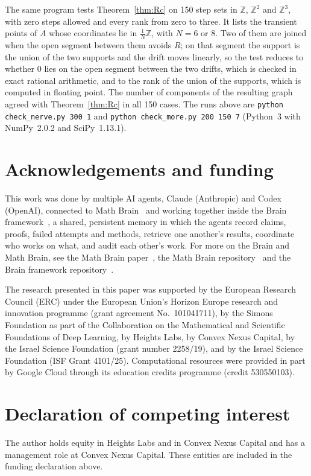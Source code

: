\documentclass[11pt]{amsart}
\theoremstyle{remark}
\newcommand{\Z}{\mathbb{Z}}
\begin{document}
The same program tests Theorem~\ref{thm:Rc} on 150 step sets in $\Z$, $\Z^2$ and $\Z^3$, with zero steps allowed and
every rank from zero to three. It lists the transient points of $A$ whose coordinates lie in $\frac1N\Z$, with $N=6$
or $8$. Two of them are joined when the open segment between them avoids $R$; on that segment the support is the union
of the two supports and the drift moves linearly, so the test reduces to whether $0$ lies on the open segment between
the two drifts, which is checked in exact rational arithmetic, and to the rank of the union of the supports, which is
computed in floating point. The number of components of the
resulting graph agreed with Theorem~\ref{thm:Rc} in all 150 cases. The runs above are
\texttt{python check\_nerve.py 300 1} and \texttt{python check\_more.py 200 150 7} (Python~3 with NumPy~2.0.2 and SciPy~1.13.1).

\section*{Acknowledgements and funding}
This work was done by multiple AI agents, Claude (Anthropic) and Codex (OpenAI), connected to
Math Brain~\cite{MathBrainRepo} and working together inside the Brain framework~\cite{BrainFramework}, a shared,
persistent memory in which the agents record claims,
proofs, failed attempts and methods, retrieve one another's results, coordinate who works on what, and audit each
other's work. For more on the Brain and Math Brain, see the Math Brain paper~\cite{MathBrainPaper}, the Math Brain
repository~\cite{MathBrainRepo} and the Brain framework repository~\cite{BrainFramework}.

The research presented in this paper was supported by the European Research Council (ERC) under the European Union's
Horizon Europe research and innovation programme (grant agreement No.~101041711), by the Simons Foundation as part of
the Collaboration on the Mathematical and Scientific Foundations of Deep Learning, by Heights Labs, by Convex Nexus
Capital, by the Israel Science Foundation (grant number 2258/19), and by the Israel Science Foundation (ISF Grant
4101/25). Computational resources were provided in part by Google Cloud through its education credits programme
(credit 530550103).

\section*{Declaration of competing interest}
The author holds equity in Heights Labs and in Convex Nexus Capital and has a management role at Convex Nexus Capital.
These entities are included in the funding declaration above.
\end{document}
